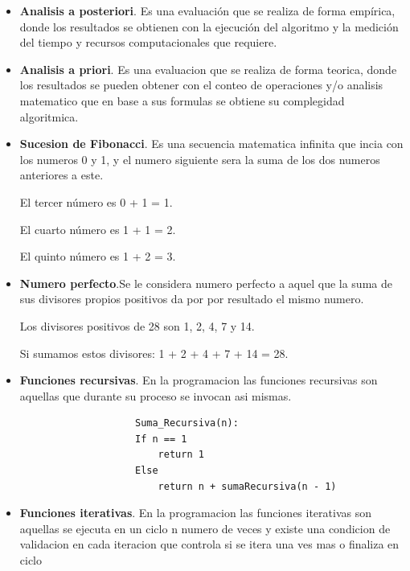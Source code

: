 \documentclass[12pt,twoside]{article}
\begin{document}
\begin{itemize}
\item \textbf{Analisis a posteriori}. Es una evaluación que se realiza de forma empírica, donde los resultados se obtienen con la ejecución del algoritmo y la medición del tiempo y recursos computacionales que requiere\cite{concep1}.

\item \textbf{Analisis a priori}. Es una evaluacion que se realiza de forma teorica, donde los resultados se pueden obtener con el conteo de operaciones y/o analisis matematico que en base a sus formulas se obtiene su complegidad algoritmica\cite{concep1}.


\item \textbf{Sucesion de Fibonacci}. Es una secuencia matematica infinita que incia con los numeros 0 y 1, y el numero siguiente sera la suma de los dos numeros anteriores a este\cite{fibo}.\\

\centerline{El tercer número es 0 + 1 = 1.}
\centerline{El cuarto número es 1 + 1 = 2.}
\centerline{El quinto número es 1 + 2 = 3.}

\item \textbf{Numero perfecto}.Se le considera numero perfecto a aquel que la suma de sus divisores propios positivos da por por resultado el mismo numero\cite{key}.\\

\centerline{Los divisores positivos de 28 son 1, 2, 4, 7 y 14.}
\centerline{Si sumamos estos divisores: 1 + 2 + 4 + 7 + 14 = 28.}

\item \textbf{Funciones recursivas}. En la programacion las funciones recursivas son aquellas que durante su proceso se invocan asi mismas.

\begin{centering}
\begin{verbatim}
                    Suma_Recursiva(n):
                    If n == 1
                        return 1 
                    Else
                        return n + sumaRecursiva(n - 1)
\end{verbatim}
\end{centering}

\item \textbf{Funciones iterativas}. En la programacion las funciones iterativas son aquellas se ejecuta en un ciclo n numero de veces y existe una condicion de validacion en cada iteracion que controla si se itera una ves mas o finaliza en ciclo


\end{itemize}
\end{document}
